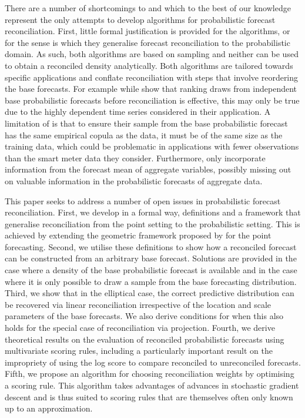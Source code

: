 \documentclass[12pt]{article}
\theoremstyle{definition}
\begin{document}
There are a number of shortcomings to \citet{JeoEtAl2019} and \citet{Taieb2017} which to the best of our knowledge represent the only attempts to develop algorithms for probabilistic forecast reconciliation.  First, little formal justification is provided for the algorithms, or for the sense is which they generalise forecast reconciliation to the probabilistic domain.  As such, both algorithms are based on sampling and neither can be used to obtain a reconciled density analytically.  Both algorithms are tailored towards specific applications and conflate reconciliation with steps that involve reordering the base forecasts.  For example while  \citet{JeoEtAl2019} show that ranking draws from independent base probabilistic forecasts before reconciliation is effective, this may only be true due to the highly dependent time series considered in their application. A limitation of \citet{Taieb2017} is that to ensure their sample from the base probabilistic forecast has the same empirical copula as the data, it must be of the same size as the training data, which could be problematic in applications with fewer observations than the smart meter data they consider.  Furthermore, \citet{Taieb2017} only incorporate information from the forecast mean of aggregate variables, possibly missing out on valuable information in the probabilistic forecasts of aggregate data.

This paper seeks to address a number of open issues in probabilistic forecast reconciliation.  First, we develop in a formal way, definitions and a framework that generalise reconciliation from the point setting to the probabilistic setting.  This is achieved by extending the geometric framework proposed by \cite{PanEtAl2019HF} for the point forecasting.  Second, we utilise these definitions to show how a reconciled forecast can be constructed from an arbitrary base forecast.  Solutions are provided in the case where a density of the base probabilistic forecast is available and in the case where it is only possible to draw a sample from the base forecasting distribution.  Third, we show that in the elliptical case, the correct predictive distribution can be recovered via linear reconciliation irrespective of the location and scale parameters of the base forecasts.  We also derive conditions for when this also holds for the special case of reconciliation via projection.  Fourth, we derive theoretical results on the evaluation of reconciled probabilistic forecasts using multivariate scoring rules, including a particularly important result on the impropriety of using the log score to compare reconciled to unreconciled forecasts.  Fifth, we propose an algorithm for choosing reconciliation weights by optimising a scoring rule.  This algorithm takes advantages of advances in stochastic gradient descent and is thus suited to scoring rules that are themselves often only known up to an approximation.
\end{document}

